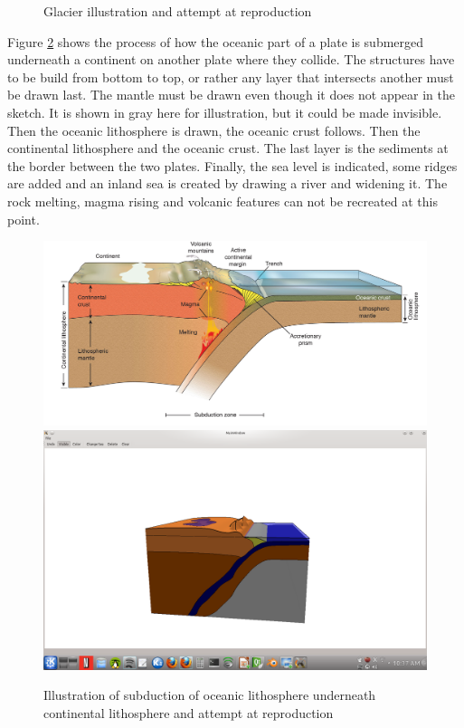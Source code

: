 \documentclass[a4paper,12pt]{report}
\begin{document}
\begin{figure}
 \caption{Glacier illustration and attempt at reproduction}
 \label{fig:glacier}
\end{figure}

Figure \ref{fig:subduction} shows the process of how the oceanic part of a plate is submerged underneath a continent on another plate where they collide. The structures have to be build from bottom to top, or rather any layer that intersects another must be drawn last. The mantle must be drawn even though it does not appear in the sketch. It is shown in gray here for illustration, but it could be made invisible. Then the oceanic lithosphere is drawn, the oceanic crust follows. Then the continental lithosphere and the oceanic crust. The last layer is the sediments at the border between the two plates. Finally, the sea level is indicated, some ridges are added and an inland sea is created by drawing a river and widening it. The rock melting, magma rising and volcanic features can not be recreated at this point.
\begin{figure}
\includegraphics[width=.8\linewidth]{thesis/geo/english/subductionCont.jpg}
\includegraphics[trim = 50mm 30mm 50mm 50mm, clip,width=.8\linewidth]{thesis/resultsSection/subductionSketch.png}

 \caption{Illustration of subduction of oceanic lithosphere underneath continental lithosphere and attempt at reproduction}
 \label{fig:subduction}
\end{figure}
\end{document}
